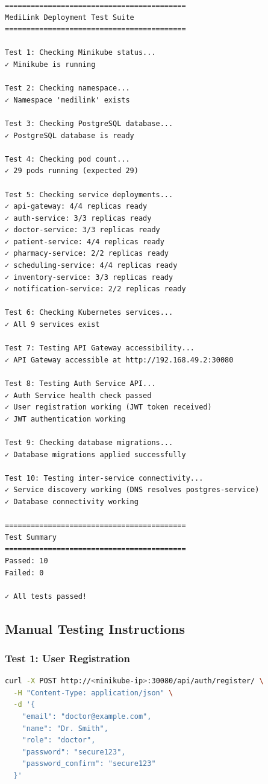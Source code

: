 \documentclass[12pt,a4paper]{article}
\begin{document}
\begin{lstlisting}[caption={Test Output Example}]
==========================================
MediLink Deployment Test Suite
==========================================

Test 1: Checking Minikube status...
✓ Minikube is running

Test 2: Checking namespace...
✓ Namespace 'medilink' exists

Test 3: Checking PostgreSQL database...
✓ PostgreSQL database is ready

Test 4: Checking pod count...
✓ 29 pods running (expected 29)

Test 5: Checking service deployments...
✓ api-gateway: 4/4 replicas ready
✓ auth-service: 3/3 replicas ready
✓ doctor-service: 3/3 replicas ready
✓ patient-service: 4/4 replicas ready
✓ pharmacy-service: 2/2 replicas ready
✓ scheduling-service: 4/4 replicas ready
✓ inventory-service: 3/3 replicas ready
✓ notification-service: 2/2 replicas ready

Test 6: Checking Kubernetes services...
✓ All 9 services exist

Test 7: Testing API Gateway accessibility...
✓ API Gateway accessible at http://192.168.49.2:30080

Test 8: Testing Auth Service API...
✓ Auth Service health check passed
✓ User registration working (JWT token received)
✓ JWT authentication working

Test 9: Checking database migrations...
✓ Database migrations applied successfully

Test 10: Testing inter-service connectivity...
✓ Service discovery working (DNS resolves postgres-service)
✓ Database connectivity working

==========================================
Test Summary
==========================================
Passed: 10
Failed: 0

✓ All tests passed!
\end{lstlisting}

\subsection{Manual Testing Instructions}

\subsubsection{Test 1: User Registration}
\begin{lstlisting}[language=bash]
curl -X POST http://<minikube-ip>:30080/api/auth/register/ \
  -H "Content-Type: application/json" \
  -d '{
    "email": "doctor@example.com",
    "name": "Dr. Smith",
    "role": "doctor",
    "password": "secure123",
    "password_confirm": "secure123"
  }'
\end{lstlisting}
\end{document}
